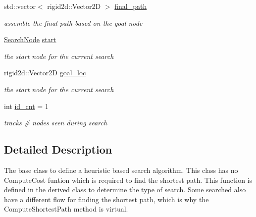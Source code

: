 \begin{DoxyCompactItemize}
std\+::vector$<$ rigid2d\+::\+Vector2D $>$ \hyperlink{classhsearch_1_1HSearch_a3188c5cda32b79ace51327a4ede85f33}{final\+\_\+path}
\begin{DoxyCompactList}\small\item\em assemble the final path based on the goal node \end{DoxyCompactList}\item 
\mbox{\label{classhsearch_1_1HSearch_a8eedd2e1bd6e1d889fdd50e5fa53ad01}} 
\hyperlink{structhsearch_1_1SearchNode}{Search\+Node} \hyperlink{classhsearch_1_1HSearch_a8eedd2e1bd6e1d889fdd50e5fa53ad01}{start}
\begin{DoxyCompactList}\small\item\em the start node for the current search \end{DoxyCompactList}\item 
\mbox{\label{classhsearch_1_1HSearch_a201d281d6a8d9fcc4158772f862d1847}} 
rigid2d\+::\+Vector2D \hyperlink{classhsearch_1_1HSearch_a201d281d6a8d9fcc4158772f862d1847}{goal\+\_\+loc}
\begin{DoxyCompactList}\small\item\em the start node for the current search \end{DoxyCompactList}\item 
\mbox{\label{classhsearch_1_1HSearch_a3b741554035ca11f6db86bb14ee329c6}} 
int \hyperlink{classhsearch_1_1HSearch_a3b741554035ca11f6db86bb14ee329c6}{id\+\_\+cnt} = 1
\begin{DoxyCompactList}\small\item\em tracks \# nodes seen during search \end{DoxyCompactList}\end{DoxyCompactItemize}


\subsection{Detailed Description}
The base class to define a heuristic based search algorithm. This class has no Compute\+Cost funtion which is required to find the shortest path. This function is defined in the derived class to determine the type of search. Some searched also have a different flow for finding the shortest path, which is why the Compute\+Shortest\+Path method is virtual. 

